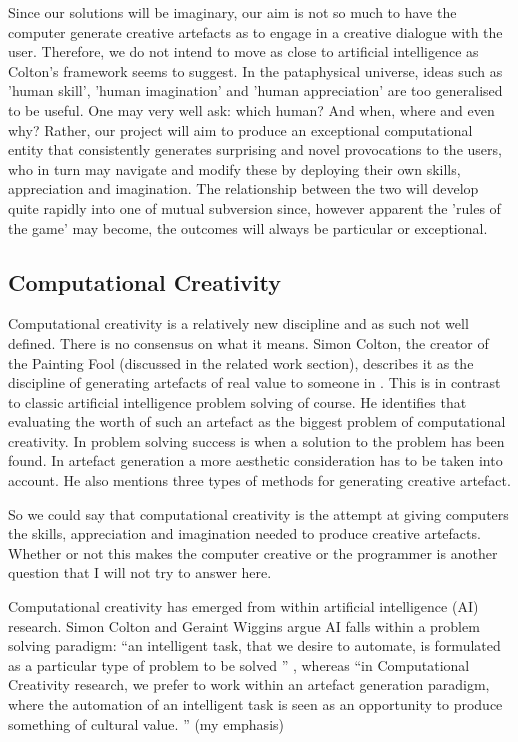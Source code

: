 Since our solutions will be imaginary, our aim is not so much to have the computer generate creative artefacts as to engage in a creative dialogue with the user. Therefore, we do not intend to move as close to artificial intelligence as Colton's framework seems to suggest. In the pataphysical universe, ideas such as 'human skill', 'human imagination' and 'human appreciation' are too generalised to be useful. One may very well ask: which human? And when, where and even why? Rather, our project will aim to produce an exceptional computational entity that consistently generates surprising and novel provocations to the users, who in turn may navigate and modify these by deploying their own skills, appreciation and imagination. The relationship between the two will develop quite rapidly into one of mutual subversion since, however apparent the 'rules of the game' may become, the outcomes will always be particular or exceptional.

\subsection{Computational Creativity}

Computational creativity is a relatively new discipline and as such not well defined. There is no consensus on what it means. Simon Colton, the creator of the Painting Fool (discussed in the related work section), describes it as the discipline of generating artefacts of real value to someone in \citep{Colton2008}. This is in contrast to classic artificial intelligence problem solving of course. He identifies that evaluating the worth of such an artefact as the biggest problem of computational creativity. In problem solving success is when a solution to the problem has been found. In artefact generation a more aesthetic consideration has to be taken into account.  He also mentions three types of methods for generating creative artefact.

So we could say that computational creativity is the attempt at giving computers the skills, appreciation and imagination needed to produce creative artefacts. Whether or not this makes the computer creative or the programmer is another question that I will not try to answer here.

Computational creativity has emerged from within artificial intelligence (AI) research. Simon Colton and Geraint Wiggins argue AI falls within a problem solving paradigm: ``an intelligent task, that we desire to automate, is formulated as a particular type of problem to be solved '' \citep[p.2]{Colton2012},  whereas ``in Computational Creativity research, we prefer to work within an artefact generation paradigm, where the automation of an intelligent task is seen as an opportunity to produce something of cultural value. '' \citep[p.2]{Colton2012}(my emphasis)

